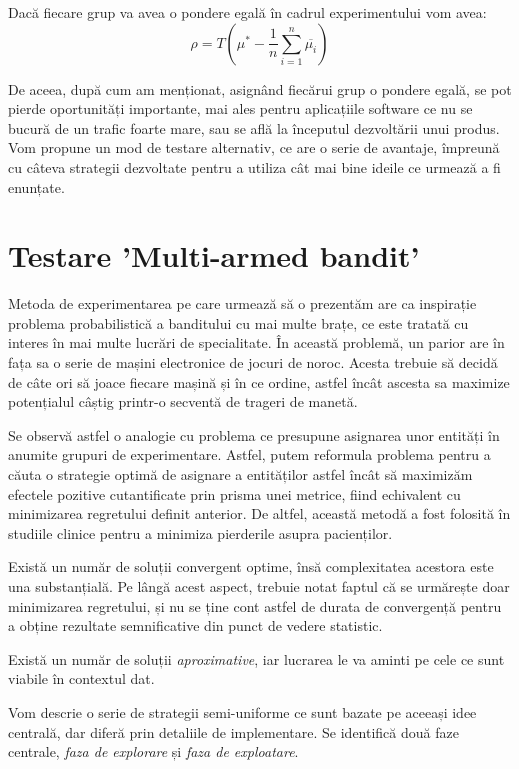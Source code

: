 \begin{remark}
	Dacă fiecare grup va avea o pondere egală în cadrul experimentului vom avea:
	\[
	\rho = T ( \mu^*  - \frac{1}{n} \sum_{i = 1}^{n}\overline{\mu_i})
	\]
\end{remark}

De aceea, după cum am menționat, asignând fiecărui grup o pondere egală, se pot pierde oportunități importante, mai ales pentru aplicațiile software ce nu se bucură de un trafic foarte mare, sau se află la începutul dezvoltării unui produs. Vom propune un mod de testare alternativ, ce are o serie de avantaje, împreună cu câteva strategii dezvoltate pentru a utiliza cât mai bine ideile ce urmează a fi enunțate.

\section{Testare 'Multi-armed bandit'}

Metoda de experimentarea pe care urmează să o prezentăm are ca inspirație problema probabilistică a banditului cu mai multe brațe, ce este tratată cu interes în mai multe lucrări de specialitate. În această problemă, un parior are în fața sa o serie de mașini electronice de jocuri de noroc. Acesta trebuie să decidă de câte ori să joace fiecare mașină și în ce ordine, astfel încât ascesta sa maximize potențialul câștig printr-o secventă de trageri de manetă. 

Se observă astfel o analogie cu problema ce presupune asignarea unor entități în anumite grupuri de experimentare. Astfel, putem reformula problema pentru a căuta o strategie optimă de asignare a entităților astfel încât să maximizăm efectele pozitive cutantificate prin prisma unei metrice, fiind echivalent cu minimizarea regretului definit anterior. De altfel, această metodă a fost folosită în studiile clinice pentru a minimiza pierderile asupra pacienților.

Există un număr de soluții convergent optime, însă complexitatea acestora este una substanțială. Pe lângă acest aspect, trebuie notat faptul că se urmărește doar minimizarea regretului, și nu se ține cont astfel de durata de convergență pentru a obține rezultate semnificative din punct de vedere statistic. 


Există un număr de soluții \textit{aproximative}, iar lucrarea le va aminti pe cele ce sunt viabile în contextul dat.

Vom descrie o serie de strategii semi-uniforme ce sunt bazate pe aceeași idee centrală, dar diferă prin detaliile de implementare. Se identifică două faze centrale, \textit{faza de explorare} și \textit{faza de exploatare}.

